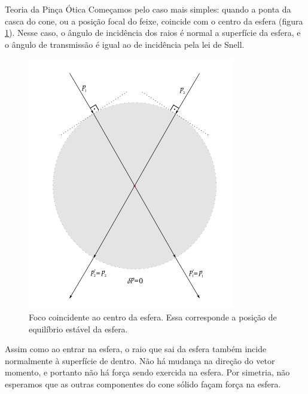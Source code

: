 \begin{chapter}{Teoria da Pinça Ótica}
Começamos pelo caso mais simples: quando a ponta da casca do cone, ou a posição focal do feixe, coincide com o centro da esfera (figura \ref{foco_coinc}). Nesse caso, o ângulo de incidência dos raios é normal a superfície da esfera, e o ângulo de transmissão é igual ao de incidência pela lei de Snell.
%
\begin{figure}[h]
\begin{center}
\includegraphics[scale=.8]{geom_foco_coincII}
\caption{Foco coincidente ao centro da esfera. Essa corresponde a posição de equilíbrio estável da esfera.}
\label{foco_coinc}
\end{center}
\end{figure}
%
Assim como ao entrar na esfera, o raio que sai da esfera também incide normalmente à superfície de dentro. Não há mudança na direção do vetor momento, e portanto não há força sendo exercida na esfera. Por simetria, não esperamos que as outras componentes do cone sólido façam força na esfera.


\end{chapter}
